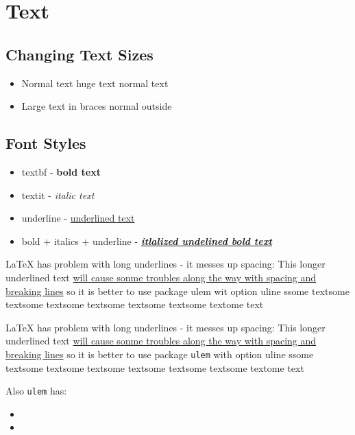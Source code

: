 \documentclass{article}
\begin{document}
\pagecolor{darkgray}
\color{cyan}

\section{Text}
\subsection{Changing Text Sizes}
\begin{itemize}
    \item Normal text \Huge huge text \normalsize normal text
    \item {\Large Large text in braces} normal outside
\end{itemize}

\subsection{Font Styles}
\begin{itemize}
    \item textbf - \textbf{bold text}
    \item textit - \textit{italic text}
    \item  underline - \underline{underlined text}
    \item bold + italics + underline - \textbf{\textit{\underline{itlalized undelined bold text}}}
\end{itemize}




\LaTeX{} has problem with long underlines - it messes up spacing:
This longer underlined text \underline{will cause sonme troubles along the way with spacing and breaking lines}
so it is better to use package ulem wit option uline ssome textsome textsome textsome textsome textsome textsome textome text

\medskip

\LaTeX{} has problem with long underlines - it messes up spacing:
This longer underlined text \uline{will cause sonme troubles along the way with spacing and breaking lines}
so it is better to use package \texttt{ulem} with option uline ssome textsome 
textsome textsome textsome textsome textsome textome text

Also \texttt{ulem} has:
\begin{itemize}
    \item {}
    \item {}
\end{itemize}
\end{document}
